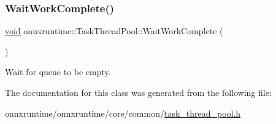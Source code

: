 \mbox{\label{classonnxruntime_1_1TaskThreadPool_a0628841b67f641cb9cdab712ff50b1d1}} 
\subsubsection{\texorpdfstring{Wait\+Work\+Complete()}{WaitWorkComplete()}}
{\footnotesize\ttfamily \mbox{\hyperlink{mlasi_8h_a88f941d423cb2a819b70a1358982b1a6}{void}} onnxruntime\+::\+Task\+Thread\+Pool\+::\+Wait\+Work\+Complete (\begin{DoxyParamCaption}{ }\end{DoxyParamCaption})\hspace{0.3cm}{\ttfamily [inline]}}



Wait for queue to be empty. 



The documentation for this class was generated from the following file\+:\begin{DoxyCompactItemize}
\item 
onnxruntime/onnxruntime/core/common/\mbox{\hyperlink{task__thread__pool_8h}{task\+\_\+thread\+\_\+pool.\+h}}\end{DoxyCompactItemize}
